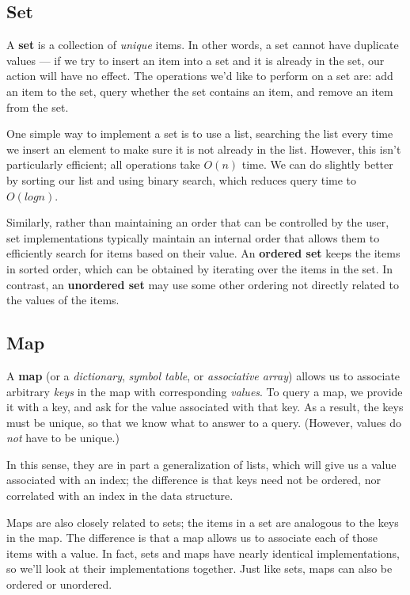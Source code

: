 \subsection{Set}
A \textbf{set} is a collection of \textit{unique} items. In other words, a set cannot have duplicate values --- if we try to insert an item into a set and it is already in the set, our action will have no effect. The operations we'd like to perform on a set are: add an item to the set, query whether the set contains an item, and remove an item from the set.

One simple way to implement a set is to use a list, searching the list every time we insert an element to make sure it is not already in the list. However, this isn't particularly efficient; all operations take $O(n)$ time. We can do slightly better by sorting our list and using binary search, which reduces query time to $O(log n)$.

Similarly, rather than maintaining an order that can be controlled by the user, set implementations typically maintain an internal order that allows them to efficiently search for items based on their value. An \textbf{ordered set} keeps the items in sorted order, which can be obtained by iterating over the items in the set. In contrast, an \textbf{unordered set} may use some other ordering not directly related to the values of the items.


\subsection{Map}

A \textbf{map} (or a \textit{dictionary}, \textit{symbol table}, or \textit{associative array}) allows us to associate arbitrary \textit{keys} in the map with corresponding \textit{values}. To query a map, we provide it with a key, and ask for the value associated with that key. As a result, the keys must be unique, so that we know what to answer to a query. (However, values do \textit{not} have to be unique.)

In this sense, they are in part a generalization of lists, which will give us a value associated with an index; the difference is that keys need not be ordered, nor correlated with an index in the data structure.

Maps are also closely related to sets; the items in a set are analogous to the keys in the map. The difference is that a map allows us to associate each of those items with a value. In fact, sets and maps have nearly identical implementations, so we'll look at their implementations together. Just like sets, maps can also be ordered or unordered.

